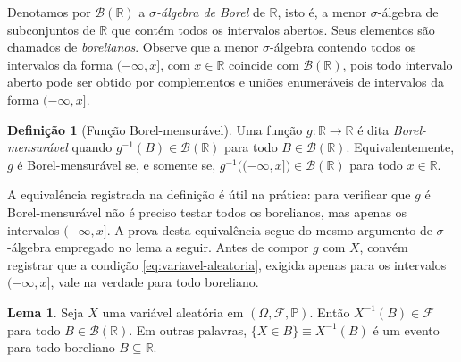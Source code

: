 \documentclass[12pt,portuguese]{article}
\theoremstyle{definition}
\newtheorem{definition}[definition]{Definição}
\newtheorem{lemma}[lemma]{Lema}
\theoremstyle{plainexercise}
\theoremstyle{starredexercise}
\theoremstyle{definition}
\begin{document}
\bigskip

Denotamos por $\mathscr{B}(\mathbb{R})$ a \emph{$\sigma$-álgebra de Borel} de
$\mathbb{R}$, isto é, a menor $\sigma$-álgebra de subconjuntos de
$\mathbb{R}$ que contém todos os intervalos abertos. Seus elementos são
chamados de \emph{borelianos}. Observe que a menor $\sigma$-álgebra 
contendo todos os intervalos da forma $(-\infty,x]$, com
$x\in\mathbb{R}$ coincide com $\mathscr{B}(\mathbb{R})$, pois todo intervalo
aberto pode ser obtido por complementos e uniões enumeráveis de intervalos da forma
$(-\infty,x]$.

\bigskip

\begin{definition}[Função Borel-mensurável]
\label{def:borel-mensuravel}
Uma função $g:\mathbb{R}\to\mathbb{R}$ é dita \emph{Borel-mensurável} quando
$g^{-1}(B)\in\mathscr{B}(\mathbb{R})$ para todo $B\in\mathscr{B}(\mathbb{R})$.
Equivalentemente, $g$ é Borel-mensurável se, e somente se,
$g^{-1}\bigl((-\infty,x]\bigr)\in\mathscr{B}(\mathbb{R})$ para todo
$x\in\mathbb{R}$.
\end{definition}

\bigskip 
A equivalência registrada na definição é útil na prática: para verificar que
$g$ é Borel-mensurável não é preciso testar todos os borelianos, mas apenas os
intervalos $(-\infty,x]$. A prova desta equivalência segue do mesmo argumento de $\sigma$-álgebra
empregado no lema a seguir. Antes de compor $g$ com $X$, convém registrar que
a condição \eqref{eq:variavel-aleatoria}, exigida apenas para os intervalos
$(-\infty,x]$, vale na verdade para todo boreliano.

\bigskip 

\begin{lemma}\label{lem:pre-imagem-boreliano}
Seja $X$ uma variável aleatória em $(\Omega,\mathcal{F},\mathbb{P})$. Então
$X^{-1}(B)\in\mathcal{F}$ para todo $B\in\mathscr{B}(\mathbb{R})$. Em outras
palavras, $\{X\in B\}\equiv X^{-1}(B)$ é um evento para todo boreliano
$B\subseteq\mathbb{R}$.
\end{lemma}
\end{document}
